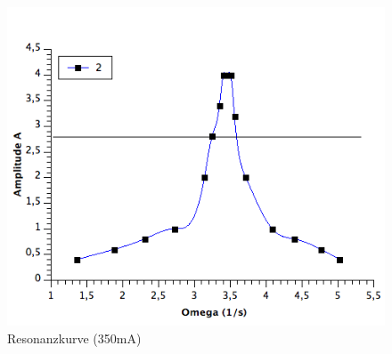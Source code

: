 \documentclass[12pt,a4paper]{article}
\begin{document}
\begin{figure}[H]
	\centering
	\includegraphics[scale=0.78]{./figure/Messung1_Resonanzkurve_350mA.png}
	\caption{Resonanzkurve (350mA)}
	\label{fig:resonanzkurve_350mA}
\end{figure}
\end{document}
